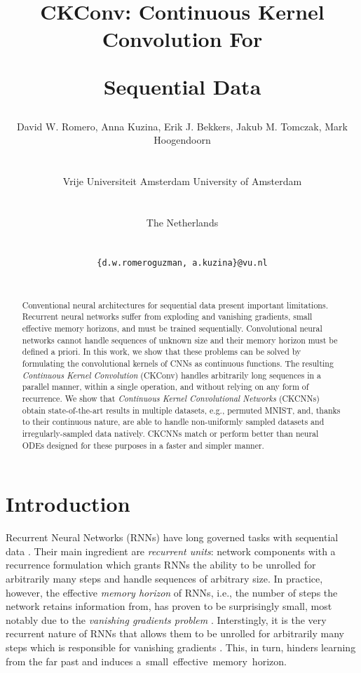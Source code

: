 \documentclass{article}
\title{CKConv: Continuous Kernel Convolution For \centerline{Sequential Data}}
\author{\centerline{David W. Romero, Anna Kuzina, Erik J. Bekkers, Jakub M. Tomczak, Mark Hoogendoorn}\\
    \centerline{\hspace{0.5mm}Vrije Universiteit Amsterdam \quad \hspace{0.5mm}University of Amsterdam}\\
  \centerline{The Netherlands}\\
  \centerline{\texttt{\{d.w.romeroguzman, a.kuzina\}@vu.nl}}\\
}
\begin{document}
\maketitle

\begin{abstract}
   Conventional neural architectures for sequential data present important limitations. Recurrent neural networks suffer from exploding and vanishing gradients, small effective memory horizons, and must be trained sequentially. Convolutional neural networks cannot handle sequences of unknown size and their memory horizon must be defined a priori. In this work, we show that these problems can be solved by formulating the convolutional kernels of CNNs as continuous functions. The resulting \textit{Continuous Kernel Convolution} (CKConv) handles arbitrarily long sequences in a parallel manner, within a single operation, and without relying on any form of recurrence. We show that \textit{Continuous Kernel Convolutional Networks} (CKCNNs) obtain state-of-the-art results in multiple datasets, e.g., permuted MNIST, and, thanks to their continuous nature, are able to handle non-uniformly sampled datasets and irregularly-sampled data natively. CKCNNs match or perform better than neural ODEs designed for these purposes in a faster and simpler manner.
\end{abstract}

\vspace{-3mm}
\section{Introduction}
\vspace{-1mm}
Recurrent Neural Networks (RNNs) have long governed tasks with sequential data \citep{rumelhart1985learning, hochreiter1997long, chung2014empirical}. Their main ingredient are \textit{recurrent units}: network components with a recurrence formulation which grants RNNs the ability to be unrolled for arbitrarily many steps and handle sequences of arbitrary size. In practice, however, the effective \textit{memory horizon} of RNNs, i.e., the number of steps the network retains information from, has proven to be surprisingly small, most notably due to the \textit{vanishing gradients problem} \citep{hochreiter1991untersuchungen, bengio1994learning}. Interstingly, it is the very recurrent nature of RNNs that allows them to be unrolled for arbitrarily many steps which is responsible for vanishing gradients \citep{pascanu2013difficulty}. This, in turn, hinders learning from the far past and induces a~small~effective~memory~horizon.
\end{document}
